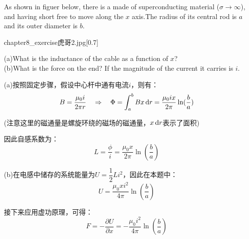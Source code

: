 \begin{solution}
    As shown in figuer below, there is a  made of superconducting material (\(\sigma\rightarrow\infty\)),
    and having short  free to move along the $x$ axis.The radius of its central rod is \( a \) and its outer diameter is \( b \).
    \begin{singlefigure}{chapter8_exercise虎哥2.jpg}[0.7]
    \end{singlefigure}

    (a)What is the inductance of the cable as a function of $x$?\\
    (b)What is the force on the end? If the magnitude of the current it carries is \( i \).
    \tcbrule

    (a)按照固定步骤，假设中心杆中通有电流$i$，则有：
    \[B = \dfrac{\mu_0 i}{2\pi r}\quad\Rightarrow\quad \Phi = \int_a^b Bx\dif r = \dfrac{\mu_0 i x}{2\pi}\ln(\dfrac{b}{a})\]

    (注意这里的磁通量是螺旋环绕的磁场的磁通量，$x\dif r$表示了面积)

    因此自感系数为：
    \[L = \dfrac{\phi}{i} = \dfrac{\mu_0 x}{2\pi}\ln(\dfrac{b}{a})\]
    
    (b)在电感中储存的系统能量为$U = \dfrac{1}{2}Li^2$，因此在本题中：
    \[U = \dfrac{\mu_0 x i^2}{4\pi}\ln(\dfrac{b}{a})\]

    接下来应用虚功原理，可得：
    \[F = -\dfrac{\partial U}{\partial x} = -\dfrac{\mu_0 i^2}{4\pi}\ln(\dfrac{b}{a})\]
\end{solution}

